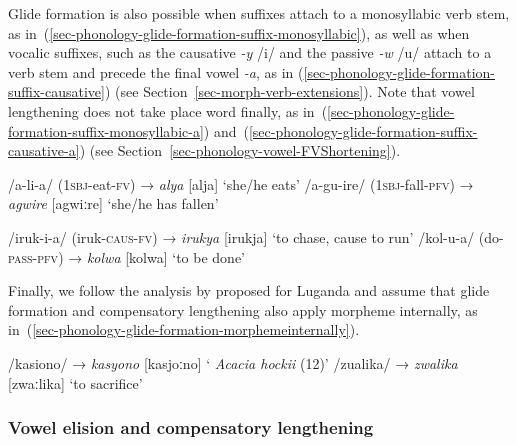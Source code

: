 Glide formation is also possible when suffixes attach to a monosyllabic verb stem, as in~(\ref{sec-phonology-glide-formation-suffix-monosyllabic}), as well as when vocalic suffixes, such as the causative \textit{-y} /i/ and the passive \textit{-w} /u/ attach to a verb stem and precede the final vowel \textit{-a}, as in (\ref{sec-phonology-glide-formation-suffix-causative}) (see Section~\ref{sec-morph-verb-extensions}). 
Note that vowel lengthening does not take place word finally, as in~(\ref{sec-phonology-glide-formation-suffix-monosyllabic-a}) and~(\ref{sec-phonology-glide-formation-suffix-causative-a}) (see Section~\ref{sec-phonology-vowel-FVShortening}).

\ea \label{sec-phonology-glide-formation-suffix-monosyllabic}
\begin{xlist}
	
	\ex \label{sec-phonology-glide-formation-suffix-monosyllabic-a}
	/a-li-a/ (\textsc{1sbj}-eat-\textsc{fv}) →  \textit{alya}  [alja] `she/he eats' 
	\ex 	/a-gu-ire/  (\textsc{1sbj}-fall-\textsc{pfv}) →  \textit{agwire}  [agwiːre] `she/he has fallen' 
	\end{xlist}	
\z

\ea \label{sec-phonology-glide-formation-suffix-causative}
\begin{xlist}
	
	\ex \label{sec-phonology-glide-formation-suffix-causative-a}
	/iruk-i-a/ (iruk-\textsc{caus}-\textsc{fv}) →  \textit{irukya} [irukja] ‘to chase, cause to run’
	\ex 	/kol-u-a/  (do-\textsc{pass}-\textsc{pfv}) →  \textit{kolwa}  [kolwa] `to be done' 
	\end{xlist}	
\z

Finally, we follow the analysis by \citet{Hymanetal1999Syllable} proposed for Luganda and assume that glide formation and compensatory lengthening also apply morpheme internally, as in~(\ref{sec-phonology-glide-formation-morphemeinternally}).

\ea \label{sec-phonology-glide-formation-morphemeinternally}
\begin{xlist}
	
	\ex 	/kasiono/ →  \textit{kasyono}  [kasjoːno] ` \textit{Acacia hockii} (12)'
	\ex 	/zualika/  →  \textit{zwalika}  [zwaːlika] `to sacrifice'
	\end{xlist}	
\z

\largerpage
\subsubsection{Vowel elision and compensatory lengthening}\label{sec-phonology-vowel-assimilation}

